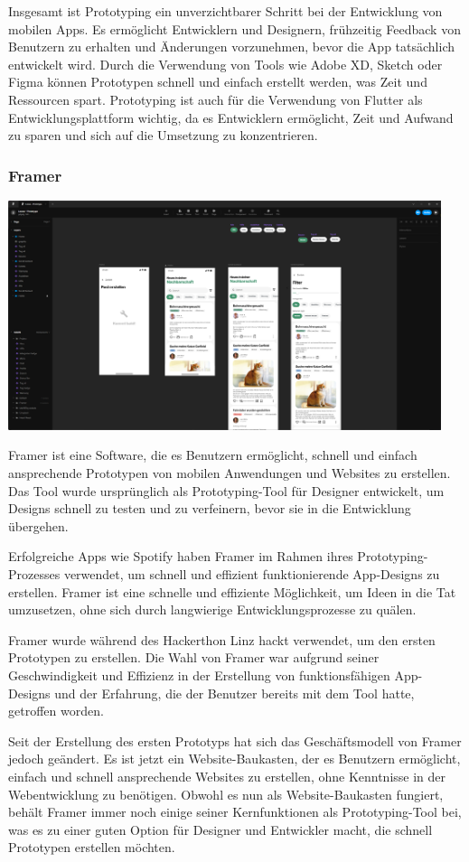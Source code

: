 Insgesamt ist Prototyping ein unverzichtbarer Schritt bei der Entwicklung von mobilen Apps. Es ermöglicht Entwicklern und Designern, frühzeitig Feedback von Benutzern zu erhalten und Änderungen vorzunehmen, bevor die App tatsächlich entwickelt wird. Durch die Verwendung von Tools wie Adobe XD, Sketch oder Figma können Prototypen schnell und einfach erstellt werden, was Zeit und Ressourcen spart. Prototyping ist auch für die Verwendung von Flutter als Entwicklungsplattform wichtig, da es Entwicklern ermöglicht, Zeit und Aufwand zu sparen und sich auf die Umsetzung zu konzentrieren.
\subsubsection{Framer}
\includegraphics[width=0.95\textwidth]{pics/nochba-framer-prototype-screenshot.png}


Framer ist eine Software, die es Benutzern ermöglicht, schnell und einfach ansprechende Prototypen von mobilen Anwendungen und Websites zu erstellen. Das Tool wurde ursprünglich als Prototyping-Tool für Designer entwickelt, um Designs schnell zu testen und zu verfeinern, bevor sie in die Entwicklung übergehen.

Erfolgreiche Apps wie Spotify haben Framer im Rahmen ihres Prototyping-Prozesses verwendet, um schnell und effizient funktionierende App-Designs zu erstellen. Framer ist eine schnelle und effiziente Möglichkeit, um Ideen in die Tat umzusetzen, ohne sich durch langwierige Entwicklungsprozesse zu quälen.

Framer wurde während des Hackerthon Linz hackt verwendet, um den ersten Prototypen zu erstellen. Die Wahl von Framer war aufgrund seiner Geschwindigkeit und Effizienz in der Erstellung von funktionsfähigen App-Designs und der Erfahrung, die der Benutzer bereits mit dem Tool hatte, getroffen worden.

Seit der Erstellung des ersten Prototyps hat sich das Geschäftsmodell von Framer jedoch geändert. Es ist jetzt ein Website-Baukasten, der es Benutzern ermöglicht, einfach und schnell ansprechende Websites zu erstellen, ohne Kenntnisse in der Webentwicklung zu benötigen. Obwohl es nun als Website-Baukasten fungiert, behält Framer immer noch einige seiner Kernfunktionen als Prototyping-Tool bei, was es zu einer guten Option für Designer und Entwickler macht, die schnell Prototypen erstellen möchten.

